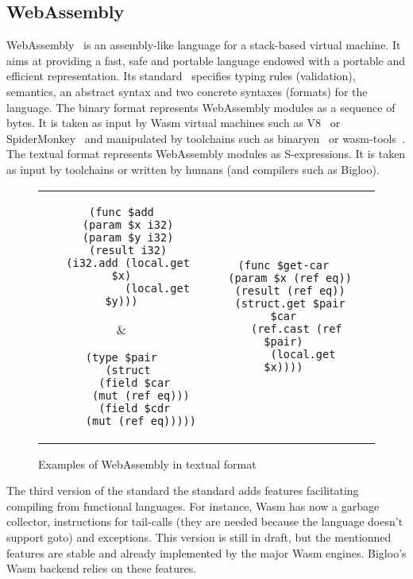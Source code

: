\documentclass[10pt]{article}
\begin{document}
\subsection{WebAssembly}
WebAssembly~\cite{haas2017bringing} is an assembly-like language for a
stack-based virtual machine. It aims at providing a fast, safe and portable
language endowed with a portable and efficient representation. Its
standard~\cite{WebAssemblyCoreSpecification3} specifies typing rules
(validation), semantics, an abstract syntax and two concrete syntaxes (formats)
for the language. The binary format represents WebAssembly modules as a sequence
of bytes. It is taken as input by Wasm virtual machines such as V8~\cite{V8} or
SpiderMonkey~\cite{SpiderMonkey} and manipulated by toolchains such as
binaryen~\cite{Binaryen} or wasm-tools~\cite{WasmTools}. The textual format
represents WebAssembly modules as S-expressions. It is taken as input by
toolchains or written by humans (and compilers such as Bigloo).
\begin{figure}[h]
\centering
\begin{tabular}{c c c}
\begin{minipage}{1.8in}
\begin{verbatim}
(func $add
  (param $x i32)
  (param $y i32)
  (result i32)
  (i32.add (local.get $x)
           (local.get $y)))
\end{verbatim}
\end{minipage}&
\begin{minipage}{1.6in}
\begin{verbatim}
(type $pair
  (struct
    (field $car
      (mut (ref eq)))
    (field $cdr
      (mut (ref eq)))))
\end{verbatim}
\end{minipage}
&\begin{minipage}{1.8in}
\begin{verbatim}
(func $get-car
  (param $x (ref eq))
  (result (ref eq))
  (struct.get $pair $car
    (ref.cast (ref $pair)
      (local.get $x))))
\end{verbatim}
\end{minipage}
\end{tabular}
\caption{Examples of WebAssembly in textual format}
\end{figure}

The third version of the standard the standard adds features facilitating
compiling from functional languages. For instance, Wasm has now a garbage
collector, instructions for tail-calls (they are needed because the language
doesn't support goto) and exceptions. This version is still in draft, but the
mentionned features are stable and already implemented by the major Wasm
engines. Bigloo's Wasm backend relies on these features.
\end{document}
